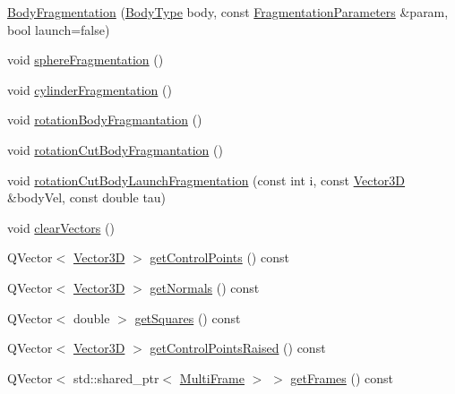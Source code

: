 \begin{DoxyCompactItemize}
\item 
\mbox{\hyperlink{class_body_fragmentation_a41cc5db36daede2845bcffbd00d30cf0}{Body\+Fragmentation}} (\mbox{\hyperlink{bodyfragmentation_8h_acf0ce63e34327e5bc336f9fe3d2d47a2}{Body\+Type}} body, const \mbox{\hyperlink{struct_fragmentation_parameters}{Fragmentation\+Parameters}} \&param, bool launch=false)
\item 
void \mbox{\hyperlink{class_body_fragmentation_afdf6a5e8d2c2f7c6e2b1434999bf0d60}{sphere\+Fragmentation}} ()
\item 
void \mbox{\hyperlink{class_body_fragmentation_aaa0982c352b4a4cc65ba7582cb4b0d9e}{cylinder\+Fragmentation}} ()
\item 
void \mbox{\hyperlink{class_body_fragmentation_a27e74d7cbfb91c48f55401b84715d8fc}{rotation\+Body\+Fragmantation}} ()
\item 
void \mbox{\hyperlink{class_body_fragmentation_ad3ae05e123182189465a904fa6f8b77b}{rotation\+Cut\+Body\+Fragmantation}} ()
\item 
void \mbox{\hyperlink{class_body_fragmentation_adcd678b58bb8d85548c9d84ff6dd8f71}{rotation\+Cut\+Body\+Launch\+Fragmentation}} (const int i, const \mbox{\hyperlink{class_vector3_d}{Vector3D}} \&body\+Vel, const double tau)
\item 
void \mbox{\hyperlink{class_body_fragmentation_a0ad2e79acc6ca53e70e9f0f9ca8cb69f}{clear\+Vectors}} ()
\item 
Q\+Vector$<$ \mbox{\hyperlink{class_vector3_d}{Vector3D}} $>$ \mbox{\hyperlink{class_body_fragmentation_a2e69253801fb3b534568e44e4c642a5f}{get\+Control\+Points}} () const
\item 
Q\+Vector$<$ \mbox{\hyperlink{class_vector3_d}{Vector3D}} $>$ \mbox{\hyperlink{class_body_fragmentation_a5cb0e540a915963e6bca93fd4fff7c45}{get\+Normals}} () const
\item 
Q\+Vector$<$ double $>$ \mbox{\hyperlink{class_body_fragmentation_a52efb3896bc6200767b606311418b580}{get\+Squares}} () const
\item 
Q\+Vector$<$ \mbox{\hyperlink{class_vector3_d}{Vector3D}} $>$ \mbox{\hyperlink{class_body_fragmentation_a204136fe52dcd14b632e8fbc1a8e4124}{get\+Control\+Points\+Raised}} () const
\item 
Q\+Vector$<$ std\+::shared\+\_\+ptr$<$ \mbox{\hyperlink{class_multi_frame}{Multi\+Frame}} $>$ $>$ \mbox{\hyperlink{class_body_fragmentation_aa6ac4c08d3f49c4e4d52cb7777b04bf9}{get\+Frames}} () const
\end{DoxyCompactItemize}
